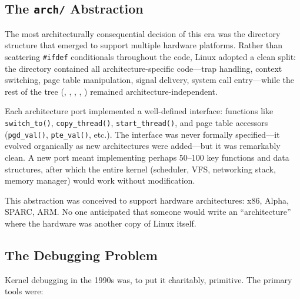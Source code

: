 \subsection{The \texttt{arch/} Abstraction}
\label{sec:history-arch-abstraction}

The most architecturally consequential decision of this era was the directory
structure that emerged to support multiple hardware platforms.  Rather than
scattering \texttt{\#ifdef} conditionals throughout the code, Linux adopted a
clean split: the  directory contained all architecture-specific
code---trap handling, context switching, page table manipulation, signal
delivery, system call entry---while the rest of the tree
(, , , ,
) remained architecture-independent.

Each architecture port implemented a well-defined interface: functions like
\texttt{switch\_to()}, \texttt{copy\_thread()}, \texttt{start\_thread()}, and
page table accessors (\texttt{pgd\_val()}, \texttt{pte\_val()}, etc.).  The
interface was never formally specified---it evolved organically as new
architectures were added---but it was remarkably clean.  A new port meant
implementing perhaps 50--100 key functions and data structures, after which the
entire kernel (scheduler, VFS, networking stack, memory manager) would work
without modification.

This abstraction was conceived to support hardware architectures: x86, Alpha,
SPARC, ARM.  No one anticipated that someone would write an ``architecture'' where
the hardware was another copy of Linux itself.

\subsection{The Debugging Problem}
\label{sec:history-debugging}

Kernel debugging in the 1990s was, to put it charitably, primitive.  The primary
tools were:

